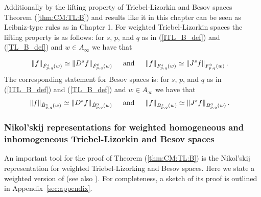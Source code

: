 Additionally by the lifting property of Triebel-Lizorkin and Besov spaces Theorem (\ref{thm:CM:TL:B}) and results like it in this chapter can be seen as Leibniz-type rules as in Chapter 1. For weighted Triebel-Lizorkin spaces the lifting property is as follows: for $s$, $p$, and $q$ as in (\ref{ITL_B_def}) and (\ref{TL_B_def}) and $w\in A_\infty$ we have that 

 \begin{align*}
 & \norm{f}{\tlw{p}{s}{q}{w}}\simeq\norm{D^s f}{\tlw{p}{0}{q}{w}} \quad \text{ and } \quad \norm{f}{\itlw{p}{s}{q}{w}}\simeq\norm{J^s f}{\itlw{p}{0}{q}{w}}.
 \end{align*}
The corresponding statement for Besov spaces is: for $s$, $p$, and $q$ as in (\ref{ITL_B_def}) and (\ref{TL_B_def}) and $w\in A_\infty$ we have that 
 \begin{align*}
 & \norm{f}{\besw{p}{s}{q}{w}}\simeq\norm{D^s f}{\besw{p}{0}{q}{w}} \quad \text{ and } \quad \norm{f}{\ibesw{p}{s}{q}{w}}\simeq\norm{J^s f}{\ibesw{p}{0}{q}{w}}.
 \end{align*}
 

  

\subsubsection{Nikol'skij representations for weighted homogeneous and inhomogeneous Triebel-Lizorkin and Besov spaces}

An important tool for the proof of Theorem (\ref{thm:CM:TL:B}) is the Nikol'skij representation for weighted Triebel-Lizorking and Besov spaces. Here we state a weighted version of \cite[Theorem 3.7]{MR837335} (see also \cite[Section 2.5.2]{MR3024598}). For  completeness, a sketch of its proof is outlined in Appendix~\ref{sec:appendix}.

